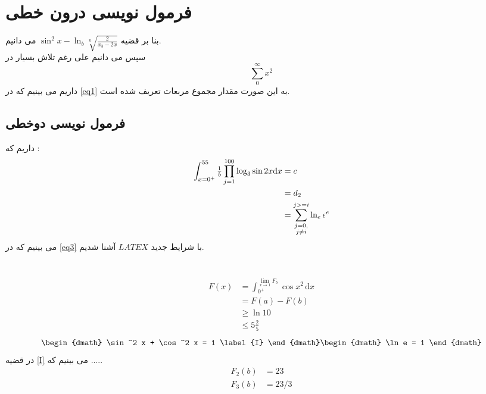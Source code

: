 \documentclass{book}
\begin{document}
\chapter{فرمول نویسی درون خطی}
\BNaz
بنا بر قضیه 
$
\sin ^{2}x - \ln_b \sqrt[n]{\frac{2}{x_3 - 2x}}  
$
می دانیم.
\\
سپس می دانیم علی رغم تلاش بسیار در 
\begin{equation}\label{eq1}
	\sum_{0}^{\infty} x^2
\end{equation}
داریم می بینیم که در \eqref{eq1}
به این صورت مقدار مجموع مربعات تعریف شده است.
\section{فرمول نویسی دوخطی}

داریم که :
\begin{align} 
	\int_{x = 0^{+}}^{55} \tfrac{1}{b} \prod_{j = 1}^{100} \log_3 \sin 2x \mathrm{d}x & = c \notag \\
	& = d_{2} \label{eq2} \\
	& = \sum_{\substack{j = 0, \\ j \neq i}}^{j >= i} \ln_e \epsilon ^{e} \label{eq3} 
\end{align}
می بینیم که در \eqref{eq3}
با شرایط جدید $LATEX$ آشنا شدیم.

\chapter{}
\Time
{}
\section{}
\begin{equation} \label{eq4}
\begin{split}
	F(x) &= \int_{0^{+}}^{\lim_{x \to 1} F_b} \cos x^2  \, \mathrm{d} x \\
	&= F(a) - F(b) \\
	& \ge \ln 10 \\
	& \le 5\tfrac{2}{5}
\end{split}
\end{equation}
\BNaz
\begin{dgroup}
\begin{dmath}
   \sin ^2 x + \cos ^2 x = 1 \label{I}
\end{dmath}

\begin{dmath}
	\ln e = 1
\end{dmath}
\end{dgroup}
در قضیه \eqref{I}
می بینیم که .....
\begin{align}
	F_2(b) &= 23 \\
	F_3(b) &= 23/3
\end{align}
\end{document}
